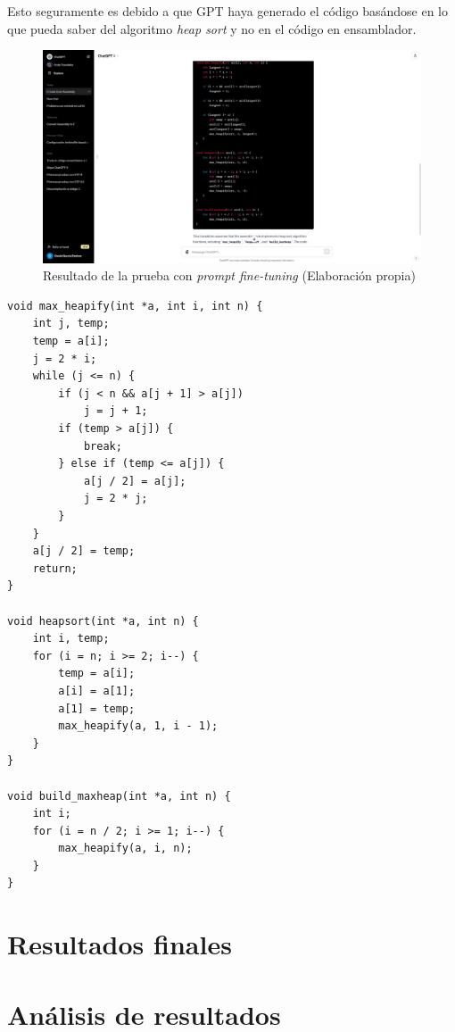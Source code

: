 Esto seguramente es debido a que GPT haya generado el código basándose en lo que pueda saber del algoritmo
\textit{heap sort} y no en el código en ensamblador.

\begin{figure}[H]
    \begin{center}
      \includegraphics[scale=0.3]{figuras/Capitulo_12/ResultadoPromptGPT4.png}
    \end{center}
    \caption[Resultado de la prueba con \textit{prompt fine-tuning}]{Resultado de la prueba con \textit{prompt fine-tuning} (Elaboración propia)}
    \label{fig:resultado_gpt4_prompt}
\end{figure}

\begin{mycode}
    \begin{verbatim}
void max_heapify(int *a, int i, int n) {
    int j, temp;
    temp = a[i];
    j = 2 * i;
    while (j <= n) {
        if (j < n && a[j + 1] > a[j])
            j = j + 1;
        if (temp > a[j]) {
            break;
        } else if (temp <= a[j]) {
            a[j / 2] = a[j];
            j = 2 * j;
        }
    }
    a[j / 2] = temp;
    return;
}

void heapsort(int *a, int n) {
    int i, temp;
    for (i = n; i >= 2; i--) {
        temp = a[i];
        a[i] = a[1];
        a[1] = temp;
        max_heapify(a, 1, i - 1);
    }
}

void build_maxheap(int *a, int n) {
    int i;
    for (i = n / 2; i >= 1; i--) {
        max_heapify(a, i, n);
    }
}
    \end{verbatim}
    \caption[Código original en C del algoritmo \textit{heap sort}]{Código original en C del algoritmo \textit{heap sort} (Elaboración propia)}
    \label{cod:heapSortC}
\end{mycode}

\section{Resultados finales}
\label{sec:resultados_finales}

\section{Análisis de resultados}
\label{sec:analisis_resultados}